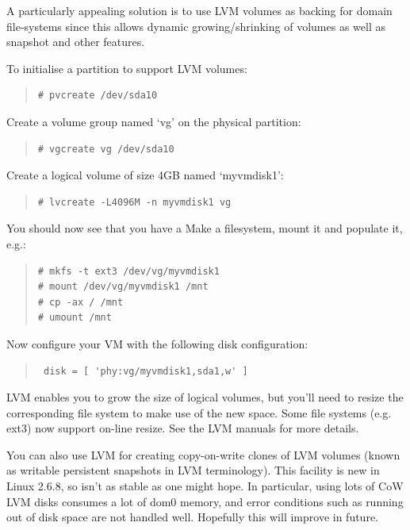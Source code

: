 \documentclass[11pt,twoside,final,openright]{report}
\begin{document}
A particularly appealing solution is to use LVM volumes 
as backing for domain file-systems since this allows dynamic
growing/shrinking of volumes as well as snapshot and other 
features. 

To initialise a partition to support LVM volumes:
\begin{quote}
\begin{verbatim} 
# pvcreate /dev/sda10		
\end{verbatim} 
\end{quote}

Create a volume group named `vg' on the physical partition:
\begin{quote}
\begin{verbatim} 
# vgcreate vg /dev/sda10
\end{verbatim} 
\end{quote}

Create a logical volume of size 4GB named `myvmdisk1':
\begin{quote}
\begin{verbatim} 
# lvcreate -L4096M -n myvmdisk1 vg
\end{verbatim} 
\end{quote}

You should now see that you have a 
Make a filesystem, mount it and populate it, e.g.:
\begin{quote}
\begin{verbatim} 
# mkfs -t ext3 /dev/vg/myvmdisk1
# mount /dev/vg/myvmdisk1 /mnt
# cp -ax / /mnt
# umount /mnt
\end{verbatim} 
\end{quote}

Now configure your VM with the following disk configuration:
\begin{quote}
\begin{verbatim} 
 disk = [ 'phy:vg/myvmdisk1,sda1,w' ]
\end{verbatim} 
\end{quote}

LVM enables you to grow the size of logical volumes, but you'll need
to resize the corresponding file system to make use of the new
space. Some file systems (e.g. ext3) now support on-line resize.  See
the LVM manuals for more details.

You can also use LVM for creating copy-on-write clones of LVM
volumes (known as writable persistent snapshots in LVM
terminology). This facility is new in Linux 2.6.8, so isn't as
stable as one might hope. In particular, using lots of CoW LVM
disks consumes a lot of dom0 memory, and error conditions such as
running out of disk space are not handled well. Hopefully this
will improve in future.
\end{document}
